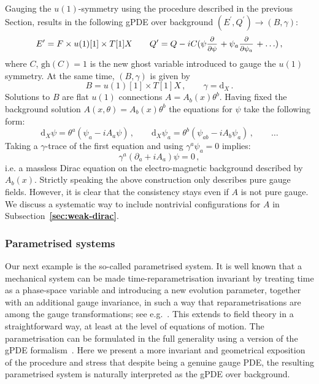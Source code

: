 \documentclass[a4paper,12pt]{article}
\numberwithin{equation}{section} %
\newcommand{\bref}[1]{\textbf{\ref{#1}}}
\newcommand{\gh}[1]{\mathrm{gh}(#1)}
\newcommand{\dx}{\mathrm{d}_X}
\renewcommand{\d}{\partial}
\newcommand{\ffrac}[2]{\raisebox{.5pt}%
  {\footnotesize$\displaystyle\frac{#1}{#2}$}\kern1pt}
\newcommand{\dl}[1]{\mathchoice{\ffrac{\d}{\d #1}}{\frac{\d}{\d #1}}{\ffrac{\d}{\d #1}}{\ffrac{\d}{\d #1}}}
\newcommand{\ch}[1]{\textcolor{red}{#1}}
\begin{document}
Gauging the $u(1)$-symmetry using the procedure described in the previous Section, results in the following gPDE over background $(E^\prime,Q^\prime) \to (B,\gamma)$:
\begin{equation}
E^\prime=F\times u(1)[1] \times T[1]X\qquad Q^\prime = Q-iC(\psi\dl{\psi}+\psi_a\dl{\psi_a}+\ldots)\,,
\end{equation}
where $C$, $\gh{C}=1$ is the new ghost variable introduced to gauge the $u(1)$ symmetry.
At the same time, $(B,\gamma)$ is given by
\begin{equation}
B= u(1)[1] \times T[1]X\,, \qquad \gamma =\dx \,.
\end{equation}
Solutions to $B$ are flat $u(1)$ connections $A=A_b(x) \theta^b$. Having fixed the background solution $A(x,\theta)=A_b(x)\theta^b$ the equations for
$\psi$ take the following form:
\begin{equation}
\dx \psi=\theta^a(\psi_a - iA_a\psi)\,, \qquad \dx \psi_a =\theta^b(\psi_{ab} - iA_b\psi_a)\,, \qquad \ldots    
\end{equation}
Taking a $\gamma$-trace of the first equation and using $\gamma^a\psi_a=0$ implies:
\begin{equation}
\gamma^a(\d_a+iA_a)\psi=0\,,
\end{equation}
i.e. a massless Dirac equation on the electro-magnetic background described by $A_b(x)$. Strictly speaking the above construction only describes pure gauge fields. However, it is clear that the consistency stays even if $A$ is not pure gauge. We discuss a systematic way to include nontrivial configurations for $A$ in Subsection~\bref{sec:weak-dirac}. 

\subsubsection{Parametrised systems}

Our next example is the so-called parametrised system. It is well known that a mechanical system can be made time-reparametrisation invariant by treating time as a phase-space variable and introducing a new evolution parameter, together with an additional gauge invariance, in such a way that reparametrisations are among the gauge transformations; see e.g.~\cite{HT-book}. This extends to field theory in a straightforward way, at least at the level of equations of motion. The parametrisation can be formulated in the full generality using a version of the gPDE formalism~\cite{Barnich:2010sw,Grigoriev:2010ic}. Here we present a more invariant and geometrical exposition of the procedure and stress that despite being a genuine gauge PDE,  the resulting parametrised system is naturally interpreted as the gPDE over background.
\end{document}

